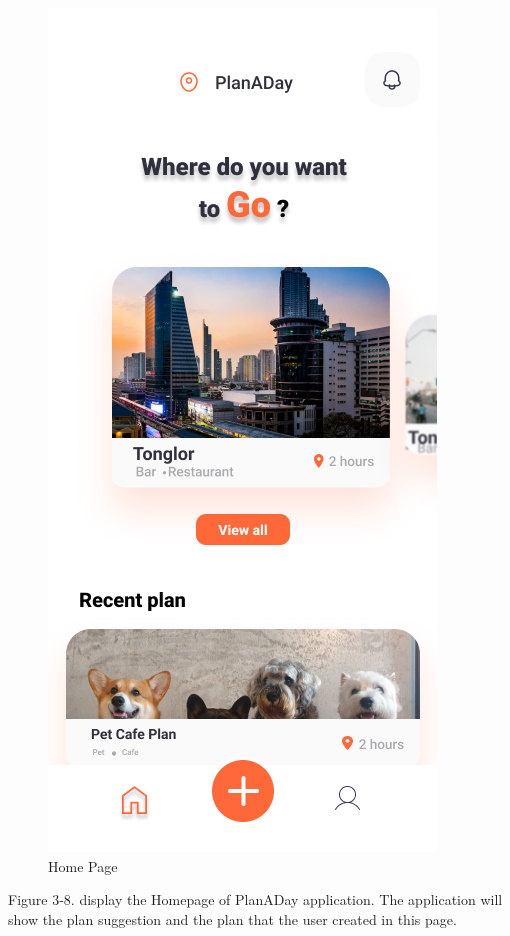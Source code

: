 \newpage
\begin{figure}[!h]
    \centering
    \includegraphics[width=0.5\linewidth]{chapter3/UI_Home_page.png}
    \caption{Home Page}
    \label{fig:Home Page}
\end{figure}
\noindent
Figure 3-8. display the Homepage of PlanADay application. The application will
show the plan suggestion and the plan that the user created in this page.


